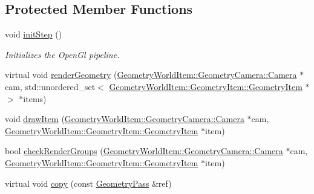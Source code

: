 \subsection*{Protected Member Functions}
\begin{DoxyCompactItemize}
\item 
\mbox{\label{class_geometry_engine_1_1_geometry_render_step_1_1_geometry_pass_a23575018d6032000ac8f2751efcc2240}} 
void \mbox{\hyperlink{class_geometry_engine_1_1_geometry_render_step_1_1_geometry_pass_a23575018d6032000ac8f2751efcc2240}{init\+Step}} ()
\begin{DoxyCompactList}\small\item\em Initializes the Open\+Gl pipeline. \end{DoxyCompactList}\item 
virtual void \mbox{\hyperlink{class_geometry_engine_1_1_geometry_render_step_1_1_geometry_pass_a2929c4675eb93efd992739baac565425}{render\+Geometry}} (\mbox{\hyperlink{class_geometry_engine_1_1_geometry_world_item_1_1_geometry_camera_1_1_camera}{Geometry\+World\+Item\+::\+Geometry\+Camera\+::\+Camera}} $\ast$cam, std\+::unordered\+\_\+set$<$ \mbox{\hyperlink{class_geometry_engine_1_1_geometry_world_item_1_1_geometry_item_1_1_geometry_item}{Geometry\+World\+Item\+::\+Geometry\+Item\+::\+Geometry\+Item}} $\ast$ $>$ $\ast$items)
\item 
void \mbox{\hyperlink{class_geometry_engine_1_1_geometry_render_step_1_1_geometry_pass_a0e3189d5f441ada51ef31e09f100e270}{draw\+Item}} (\mbox{\hyperlink{class_geometry_engine_1_1_geometry_world_item_1_1_geometry_camera_1_1_camera}{Geometry\+World\+Item\+::\+Geometry\+Camera\+::\+Camera}} $\ast$cam, \mbox{\hyperlink{class_geometry_engine_1_1_geometry_world_item_1_1_geometry_item_1_1_geometry_item}{Geometry\+World\+Item\+::\+Geometry\+Item\+::\+Geometry\+Item}} $\ast$item)
\item 
bool \mbox{\hyperlink{class_geometry_engine_1_1_geometry_render_step_1_1_geometry_pass_af37e4ae472e97482eed93fc443438b2e}{check\+Render\+Groups}} (\mbox{\hyperlink{class_geometry_engine_1_1_geometry_world_item_1_1_geometry_camera_1_1_camera}{Geometry\+World\+Item\+::\+Geometry\+Camera\+::\+Camera}} $\ast$cam, \mbox{\hyperlink{class_geometry_engine_1_1_geometry_world_item_1_1_geometry_item_1_1_geometry_item}{Geometry\+World\+Item\+::\+Geometry\+Item\+::\+Geometry\+Item}} $\ast$item)
\item 
virtual void \mbox{\hyperlink{class_geometry_engine_1_1_geometry_render_step_1_1_geometry_pass_ae69b08dfd47ccfcc3888ca53511b660d}{copy}} (const \mbox{\hyperlink{class_geometry_engine_1_1_geometry_render_step_1_1_geometry_pass}{Geometry\+Pass}} \&ref)
\end{DoxyCompactItemize}


